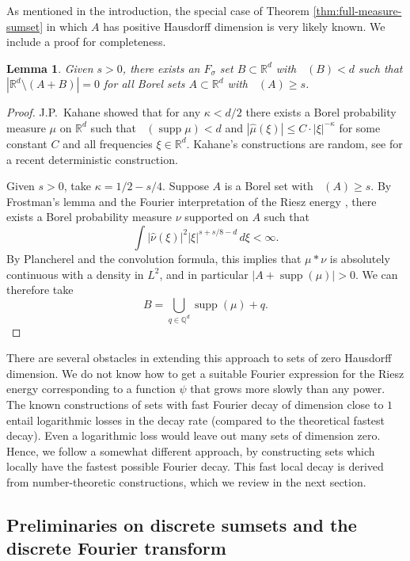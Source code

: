 \documentclass[12pt]{amsart}
\DeclareMathOperator{\hdim}{dim_H}
\DeclareMathOperator{\supp}{supp}
\newtheorem{lemma}[theorem]{Lemma}
\def\R{{\mathbb{R}}}
\numberwithin{theorem}{section}
\numberwithin{equation}{section}
\begin{document}
As mentioned in the introduction, the special case of Theorem \ref{thm:full-measure-sumset} in which $A$ has positive Hausdorff dimension is very likely known. We include a proof for completeness.
\begin{lemma} \label{lem:positive-measure-positive-dim}
    Given $s>0$, there exists an $F_\sigma$ set $B\subset \R^d$ with $\hdim(B)<d$ such that $|\R^d\setminus(A+B)|=0$ for all Borel sets $A\subset \R^d$ with $\hdim(A)\ge s$.
\end{lemma}
\begin{proof}
    J.P.~Kahane \cite{Kahane66} showed that for any $\kappa<d/2$ there exists a Borel probability measure $\mu$ on $\R^d$ such that $\hdim(\supp\mu)<d$ and $|\widehat{\mu}(\xi)| \le C\cdot|\xi|^{-\kappa}$ for some constant $C$ and all frequencies $\xi\in\R^d$. Kahane's constructions are random, see \cite{FraserHambrook23} for a recent deterministic construction.

    Given $s>0$, take $\kappa=1/2-s/4$. Suppose $A$ is a Borel set with $\hdim(A)\ge s$. By Frostman's lemma \cite[Theorem 2.8]{Mattila15} and the Fourier interpretation of the Riesz energy \cite[Theorem 3.10]{Mattila15}, there exists a Borel probability measure $\nu$ supported on $A$ such that
    \[
        \int |\widehat{\nu}(\xi)|^2 |\xi|^{s+s/8-d}\,d\xi <\infty.
    \]
    By Plancherel and the convolution formula, this implies that $\mu*\nu$ is absolutely continuous with a density in $L^2$, and in particular $|A+\supp(\mu)|>0$. We can therefore take
    \[
        B=\bigcup_{q\in\mathbb{Q}^d} \supp(\mu)+q.
    \]
\end{proof}
There are several obstacles in extending this approach to sets of zero Hausdorff dimension. We do not know how to get a suitable Fourier expression for the Riesz energy corresponding to a function $\psi$ that grows more slowly than any power. The known constructions of sets with fast Fourier decay of dimension close to $1$ entail logarithmic losses in the decay rate (compared to the theoretical fastest decay). Even a logarithmic loss would leave out many sets of dimension zero. Hence, we follow a somewhat different approach, by constructing sets which locally have the fastest possible Fourier decay. This fast local decay is derived from number-theoretic constructions, which we review in the next section.

\subsection{Preliminaries on discrete sumsets and the discrete Fourier transform}
\end{document}
